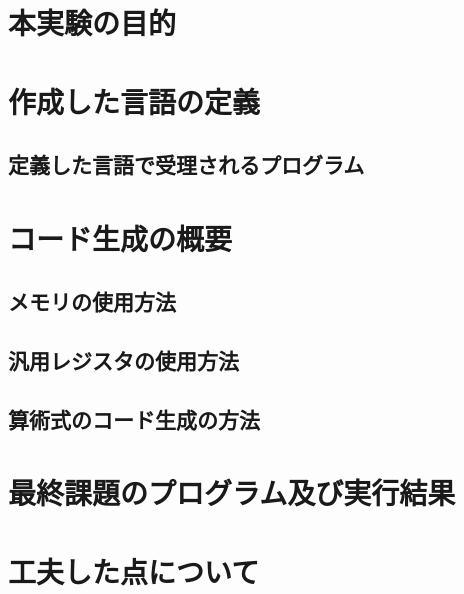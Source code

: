 

\section{本実験の目的}

\section{作成した言語の定義}

\subsection{定義した言語で受理されるプログラム}

\section{コード生成の概要}

\subsection{メモリの使用方法}

\subsection{汎用レジスタの使用方法}

\subsection{算術式のコード生成の方法}


\section{最終課題のプログラム及び実行結果}

\section{工夫した点について}

